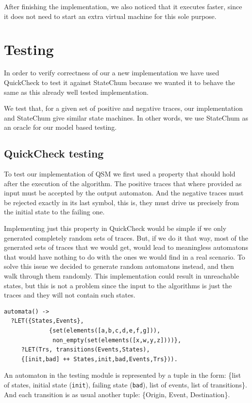 \documentclass[]{sigplanconf}
\begin{document}
After finishing the implementation, we also noticed that it executes
faster, since it does not need to start an extra virtual machine for this sole purpose.

\section{Testing}
\label{testing}

In order to verify correctness of our a new implementation
we have used QuickCheck to test it against StateChum \cite{statechum}
because we wanted it to behave the same as this already well tested
implementation.

We test that, for a given set of positive and negative traces,
our implementation and StateChum give similar state machines.
In other words, we use StateChum as an oracle for our model based testing.

\subsection{QuickCheck testing}

To test our implementation of QSM we first used a property
that should hold after the execution of the algorithm. The positive
traces that where provided as input must be accepted by the output
automaton. And the negative traces must be rejected exactly in its
last symbol, this is, they must drive us precisely from the initial
state to the failing one.

Implementing just this property in QuickCheck would be simple if we only
generated completely random sets of traces. But, if we do it that way,
most of the generated sets of traces that we would get, would lead to
meaningless automatons that would have nothing to do with the ones we
would find in a real scenario. To solve this issue we decided to
generate random automatons instead, and then walk through them randomly.
This implementation could result in unreachable states, but this is not
a problem since the input to the algorithms is just the traces and they
will not contain such states.

\begin{verbatim}
automata() ->
  ?LET({States,Events}, 
             {set(elements([a,b,c,d,e,f,g])),
              non_empty(set(elements([x,w,y,z])))},
     ?LET(Trs, transitions(Events,States),
     {[init,bad] ++ States,init,bad,Events,Trs})).
\end{verbatim}

An automaton in the testing module is represented by a tuple in the form:
\{list of states, initial state (\texttt{init}), failing state
(\texttt{bad}), list of events, list of transitions\}. And each
transition is as usual another tuple:
\{Origin, Event, Destination\}.
\end{document}
